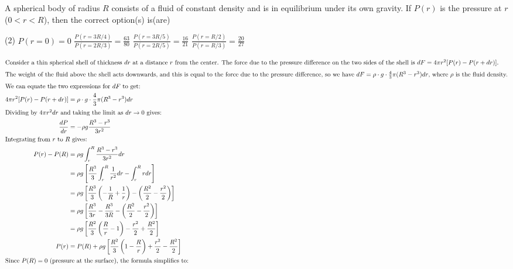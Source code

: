 \item A spherical body of radius \( R \) consists of a fluid of constant density and is in equilibrium under its own gravity. If \( P(r) \) is the pressure at \( r \) (\( 0 < r < R \)), then the correct option(s) is(are)
    \begin{tasks}(2)
        \task \( P(r = 0) = 0 \)
        \task \( \frac{P(r = 3R/4)}{P(r = 2R/3)} = \frac{63}{80} \)
        \task \( \frac{P(r = 3R/5)}{P(r = 2R/5)} = \frac{16}{21} \)
        \task \( \frac{P(r = R/2)}{P(r = R/3)} = \frac{20}{27} \)
    \end{tasks}
    \begin{solution}
        \begin{align*}
            \intertext{Consider a thin spherical shell of thickness $dr$ at a distance $r$ from the center. The force due to the pressure difference on the two sides of the shell is $dF = 4\pi r^2 [P(r) - P(r+dr)]$.}
            \intertext{The weight of the fluid above the shell acts downwards, and this is equal to the force due to the pressure difference, so we have $dF = \rho \cdot g \cdot \frac{4}{3}\pi (R^3 - r^3) dr$, where $\rho$ is the fluid density.}
            \intertext{We can equate the two expressions for $dF$ to get:}
            4\pi r^2 [P(r) - P(r+dr)] &= \rho \cdot g \cdot \frac{4}{3}\pi (R^3 - r^3) dr\\
            \intertext{Dividing by $4\pi r^2 dr$ and taking the limit as $dr \to 0$ gives:}
            \frac{dP}{dr} &= -\rho g \frac{R^3 - r^3}{3 r^2}\\
            \intertext{Integrating from $r$ to $R$ gives:}
            P(r) - P(R) &= \rho g \int_r^R \frac{R^3 - r^3}{3 r^2} dr\\
            &= \rho g \left[ \frac{R^3}{3} \int_r^R \frac{1}{r^2} dr - \int_r^R r dr \right]\\
            &= \rho g \left[ \frac{R^3}{3} \left(-\frac{1}{R} + \frac{1}{r}\right) - \left(\frac{R^2}{2} - \frac{r^2}{2}\right) \right]\\
            &= \rho g \left[ \frac{R^3}{3r} - \frac{R^3}{3R} - \left(\frac{R^2}{2} - \frac{r^2}{2}\right) \right]\\
            &= \rho g \left[ \frac{R^2}{3} \left(\frac{R}{r} - 1\right) - \frac{r^2}{2} + \frac{R^2}{2} \right]\\
            P(r) &= P(R) + \rho g \left[ \frac{R^2}{3} \left(1 - \frac{R}{r}\right) + \frac{r^2}{2} - \frac{R^2}{2} \right]\\
            \intertext{Since $P(R)=0$ (pressure at the surface), the formula simplifies to:}

\end{align*}
\end{solution}

